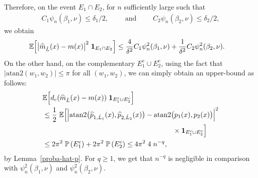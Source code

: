 \documentclass[11pt,a4paper,openany]{article}
\newcommand{\Atan}{\mbox{atan2}}
\def\E{\mathbb{E}}
\begin{document}
\noindent Therefore, on the event $E_1 \cap   E_2$, %
for $n$ sufficiently large such that 
\begin{align*}
C_{1} \psi_{n}(\beta_{1}, \nu )    \leq  \delta_{1}/2 , \qquad
\textrm{ and } \qquad   
C_{2}   \psi_{n}(\beta_{2}, \nu )    \leq  \delta_{2}/2, 
\end{align*}
we obtain
\begin{align*}
	&\E \Big[ \big| \widehat{m}_{\hat L}(x) - m(x) \big|^{2} \hspace{0.1cm}   \mathbf{1}_{E_1 \cap   E_2}  \Big]  
	\leq   \dfrac{4}{\delta^2}   C_{1}     \psi_{n}^2(\beta_{1}, \nu)
	 +      \dfrac{1}{\delta^2}     C_{2}    \psi_{n}^2(\beta_{2}, \nu).
\end{align*}
On the other hand, on the complementary $ E_1 ^{c}  \cup   E_2^{c}$, using the fact that $\big| \Atan (w_{1},w_{2}) \big| \leq \pi$ for all $ (w_{1},w_{2})$, we can simply obtain an upper-bound as follows:
\begin{align*}
	&\E \Big[ d_c( \widehat{m}_{\hat L}(x) - m(x) ) \hspace{0.1cm}  \mathbf{1}_{E_1^{c}  \cup  E_2^{c} }  \Big]
	\\
	&\leq \frac{1}{2}    \hspace{0.1cm}  \E \Big[ \Big| \Atan \big( \widehat{p}_{1, \hat L_1}(x) , \widehat{p}_{2, \hat L_2}(x)\big)  -  \Atan \big( p_{1}(x), p_{2}(x) \big)  \Big|^{2}  
	\\
	& \hspace{6.5cm} \times  \mathbf{1}_{ E_1^{c}  \cup  E_2^{c} }  \Big]
	\\
	&\leq  2 \pi^{2} \hspace{0.1cm}  \mathbb{P} \left( E_1^{c} \right)   +  2 \pi^{2} \hspace{0.1cm}  \mathbb{P} \left( E_2 ^{c} \right) \leq   4 \pi^{2} \hspace{0.1cm} 4 \hspace{0.1cm} n^{-q}, 
\end{align*}
by  Lemma~\ref{proba-hat-p}. For $q \geq 1$, we get that $n^{-q}$ is negligible in comparison with  $   \psi_{n}^2(\beta_{1}, \nu) $ and $ \psi_{n}^2(\beta_{2}, \nu)$.
\medskip
\end{document}
